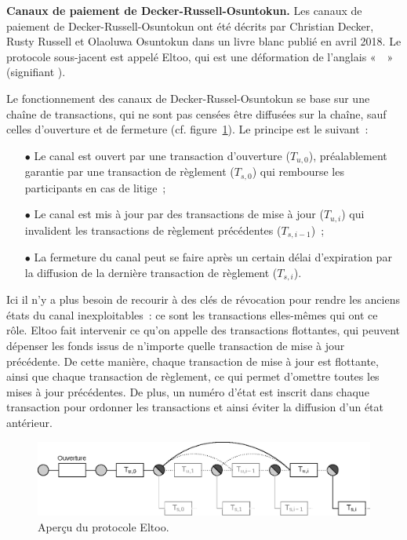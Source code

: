 \textbf{Canaux de paiement de Decker-Russell-Osuntokun.} Les canaux de paiement de Decker-Russell-Osuntokun ont été décrits par Christian Decker, Rusty Russell et Olaoluwa Osuntokun dans un livre blanc publié en avril 2018. Le protocole sous-jacent est appelé Eltoo, qui est une déformation de l'anglais «~~» (signifiant ).

Le fonctionnement des canaux de Decker-Russel-Osuntokun se base sur une chaîne de transactions, qui ne sont pas censées être diffusées sur la chaîne, sauf celles d'ouverture et de fermeture (cf. figure~\ref{fig:eltoo}). Le principe est le suivant~:

\begin{itemize}
\item[$\bullet$] Le canal est ouvert par une transaction d'ouverture ($T_{u,0}$), préalablement garantie par une transaction de règlement ($T_{s,0}$) qui rembourse les participants en cas de litige~;
\item[$\bullet$] Le canal est mis à jour par des transactions de mise à jour ($T_{u,i}$) qui invalident les transactions de règlement précédentes ($T_{s,i-1}$)~;
\item[$\bullet$] La fermeture du canal peut se faire après un certain délai d'expiration par la diffusion de la dernière transaction de règlement ($T_{s,i}$).
\end{itemize}

Ici il n'y a plus besoin de recourir à des clés de révocation pour rendre les anciens états du canal inexploitables~: ce sont les transactions elles-mêmes qui ont ce rôle. Eltoo fait intervenir ce qu'on appelle des transactions flottantes, qui peuvent dépenser les fonds issus de n'importe quelle transaction de mise à jour précédente. De cette manière, chaque transaction de mise à jour est flottante, ainsi que chaque transaction de règlement, ce qui permet d'omettre toutes les mises à jour précédentes. De plus, un numéro d'état est inscrit dans chaque transaction pour ordonner les transactions et ainsi éviter la diffusion d'un état antérieur. %

\begin{figure}[h]
  \centering
  \includegraphics[scale=0.7]{img/eltoo-offchain-protocol.eps}
  \caption{Aperçu du protocole Eltoo.}
  \label{fig:eltoo}
\end{figure}

